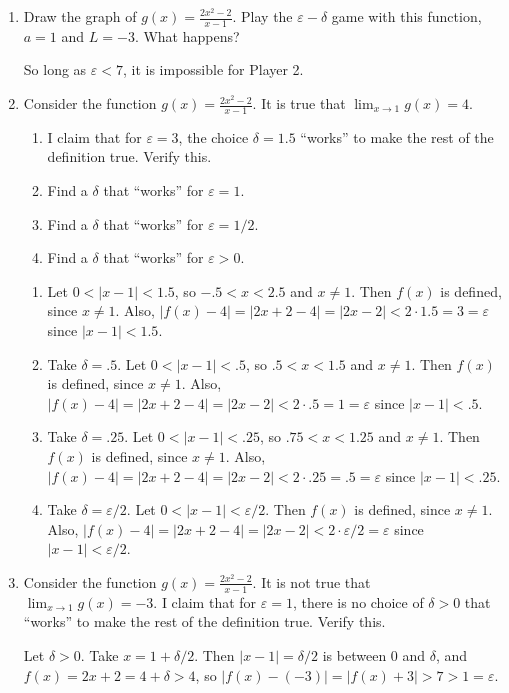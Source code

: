 \documentclass[12pt]{amsart}
\def\de{\delta}
\def\ds{\displaystyle}
\def\d{\delta}
\def\e{\varepsilon}
\numberwithin{equation}{section}
\theoremstyle{plain} %
\theoremstyle{definition}
\theoremstyle{remark}
\begin{document}
\begin{enumerate}
\item Draw the graph of $\ds g(x)=\frac{2x^2-2}{x-1}$. Play the $\e-\de$ game with this function, $a=1$ and $L=-3$. What happens?

\begin{framed}
So long as $\e<7$, it is impossible for Player 2.
\end{framed}




\item Consider the function $\ds g(x)=\frac{2x^2-2}{x-1}$. It is true that ${\lim_{x\to 1}  g(x) = 4}$.
\begin{enumerate}
\item I claim that for $\e=3$, the choice $\delta=1.5$ ``works'' to make the rest of the definition true. Verify this.
\item Find a $\delta$ that ``works'' for $\e=1$.
\item Find a $\delta$ that ``works'' for $\e=1/2$.
\item Find a $\delta$ that ``works'' for $\e>0$.
\end{enumerate}

\begin{framed}
\begin{enumerate}
\item Let $0<|x-1|<1.5$, so $-.5<x<2.5$ and $x\neq 1$. Then $f(x)$ is defined, since $x\neq 1$. Also, $|f(x)-4| = |2x+2 - 4| = |2x-2| < 2 \cdot 1.5 = 3 = \e$ since $|x-1|<1.5$.
\item Take $\d=.5$. Let $0<|x-1|<.5$, so $.5<x<1.5$ and $x\neq 1$. Then $f(x)$ is defined, since $x\neq 1$. Also, $|f(x)-4| = |2x+2 - 4| = |2x-2| < 2 \cdot .5 = 1 = \e$ since $|x-1|<.5$.
\item Take $\d=.25$. Let $0<|x-1|<.25$, so $.75<x<1.25$ and $x\neq 1$. Then $f(x)$ is defined, since $x\neq 1$. Also, $|f(x)-4| = |2x+2 - 4| = |2x-2| < 2 \cdot .25 = .5 = \e$ since $|x-1|<.25$.
\item Take $\d=\e/2$. Let $0<|x-1|<\e/2$. Then $f(x)$ is defined, since $x\neq 1$. Also, $|f(x)-4| = |2x+2 - 4| = |2x-2| < 2 \cdot \e/2 = \e$ since $|x-1|<\e/2$.
\end{enumerate}
\end{framed}

\item Consider the function $\ds g(x)=\frac{2x^2-2}{x-1}$. It is not true that $\lim_{x\to 1}  g(x) = -3$. I claim that for $\e=1$, there is no choice of $\delta>0$ that ``works'' to make the rest of the definition true. Verify this.

\begin{framed}
Let $\d>0$. Take $x=1+\d/2$. Then $|x-1|=\d/2$ is between $0$ and $\delta$, and $f(x) = 2x+2 = 4+\d > 4$, so $|f(x) - (-3)| = |f(x)+3| > 7> 1 = \e$.
\end{framed}
\end{enumerate}
\end{document}
